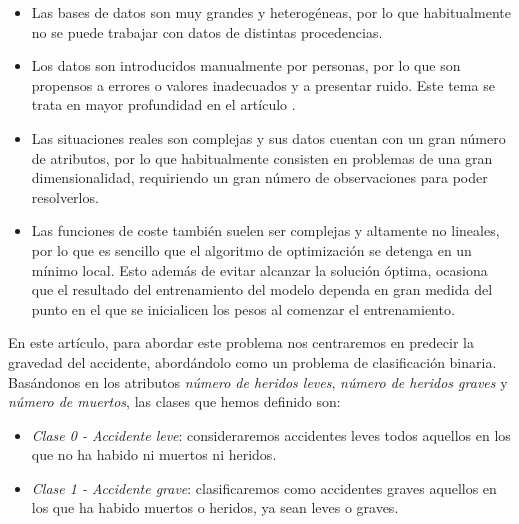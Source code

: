 \documentclass[journal,twoside]{JoPhA}
\begin{document}
\begin{itemize}
	\item Las bases de datos son muy grandes y heterogéneas, por lo que habitualmente no se puede trabajar con datos de distintas procedencias. \\
	
	\item Los datos son introducidos manualmente por personas, por lo que son propensos a errores o valores inadecuados y a presentar ruido. Este tema se trata en mayor profundidad en el artículo  \cite{analisis_datos}. \\

	\item Las situaciones reales son complejas y sus datos cuentan con un gran número de atributos, por lo que habitualmente consisten en problemas de una gran dimensionalidad, requiriendo un gran número de observaciones para poder resolverlos. \\
	
	\item Las funciones de coste también suelen ser complejas y altamente no lineales, por lo que es sencillo que el algoritmo de optimización se detenga en un mínimo local. Esto además de evitar alcanzar la solución óptima, ocasiona que el resultado del entrenamiento del modelo dependa en gran medida del punto en el que se inicialicen los pesos al comenzar el entrenamiento. \\
\end{itemize}


En este artículo, para abordar este problema nos centraremos en predecir la gravedad del accidente, abordándolo como un problema de clasificación binaria. Basándonos en los atributos \emph{número de heridos leves}, \emph{número de heridos graves} y \emph{número de muertos}, las clases que hemos definido son: \\

\begin{itemize}
	\item \textit{Clase 0 - Accidente leve}: consideraremos accidentes leves todos aquellos en los que no ha habido ni muertos ni heridos. \\
	\item \textit{Clase 1 - Accidente grave}: clasificaremos como accidentes graves aquellos en los que ha habido muertos o heridos, ya sean leves o graves. \\ 
\end{itemize}
\end{document}
